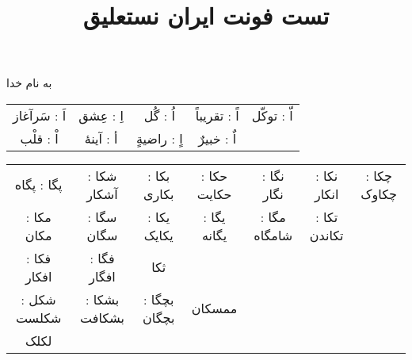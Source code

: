 \documentclass[14pt,a4paper]{article}
\begin{document}
\title{تست فونت ایران نستعلیق}
\author{ }\date{ }

\maketitle

\begin{center}
به نام خدا
\end{center}


\vspace{3mm}
\begin{tabular}{c c c c c}
 اَ : سَرآغاز & اِ : عِشق & اُ : گُل & اً : تقریباً & اّ : توکّل \\
  اْ : قلْب & أ : آینهٔ & اٍ : راضیةٍ & اٌ : خبیرٌ & 
\end{tabular}
\vspace{3mm}


\vspace{3mm}
\begin{tabular}{c c c c c c c}
پگا : پگاه & شکا : آشکار & بکا : بکاری & حکا : حکایت & نگا : نگار & نکا : انکار & چکا : چکاوک \\
مکا : مکان & سگا : سگان & یکا : یکایک & یگا : یگانه & مگا : شامگاه & تکا : تکاندن \\
فکا : افکار & فگا : افگار & ثکا \\
شکل : شکلست & بشکا : بشکافت & بچگا : بچگان & ممسکان \\
لکلک & 
\end{tabular}
\vspace{3mm}
\end{document}
